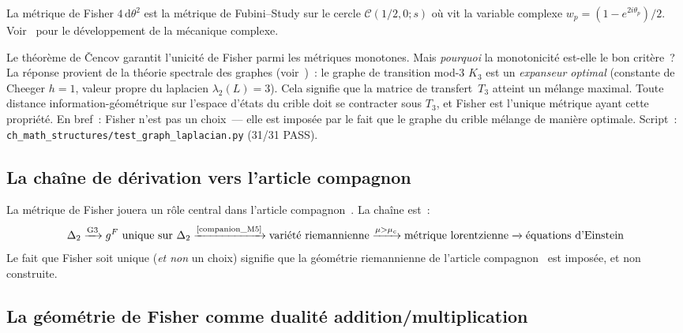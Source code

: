\documentclass[12pt,a4paper]{article}
\begin{document}
\begin{remarque}
La métrique de Fisher $4\,\mathrm{d}\theta^2$ est la métrique de
Fubini--Study sur le cercle $\mathcal{C}(1/2, 0; s)$ où vit la
variable complexe $w_p = (1 - e^{2i\theta_p})/2$.
Voir~\cite{companion_M4} pour le développement de la mécanique
complexe.
\end{remarque}

\begin{remarque}
\label{rem:expander_fisher}
Le théorème de \v{C}encov garantit l'unicité de Fisher parmi les
métriques monotones. Mais \emph{pourquoi} la monotonicité est-elle le
bon critère~? La réponse provient de la théorie spectrale des graphes
(voir~\cite{companion_M4})~: le graphe de transition mod-3 $K_3$ est
un \emph{expanseur optimal} (constante de Cheeger $h = 1$, valeur
propre du laplacien $\lambda_2(L) = 3$). Cela signifie que la matrice
de transfert~$T_3$ atteint un mélange maximal. Toute distance
information-géométrique sur l'espace d'états du crible doit se
contracter sous $T_3$, et Fisher est l'unique métrique ayant cette
propriété. En bref~: Fisher n'est pas un choix~--- elle est imposée
par le fait que le graphe du crible mélange de manière optimale.
Script~: \texttt{ch\_math\_structures/test\_graph\_laplacian.py}
(31/31 PASS).
\end{remarque}

\subsection{La chaîne de dérivation vers l'article compagnon~\cite{companion_physics}}
\label{sec:ch5_chain}

La métrique de Fisher jouera un rôle central dans l'article
compagnon~\cite{companion_physics}. La chaîne est~:
\[
  \Delta_2 \xrightarrow{\text{G3}} g^F \text{ unique sur } \Delta_2
  \xrightarrow{\text{\cite{companion_M5}}} \text{variété riemannienne}
  \xrightarrow{\mu > \mu_c} \text{métrique lorentzienne}
  \xrightarrow{} \text{équations d'Einstein}
\]
Le fait que Fisher soit unique (\emph{et non} un choix) signifie que
la géométrie riemannienne de l'article
compagnon~\cite{companion_physics} est imposée, et non construite.

\subsection{La géométrie de Fisher comme dualité addition/multiplication}
\label{sec:ch5_add_mult}
\end{document}
